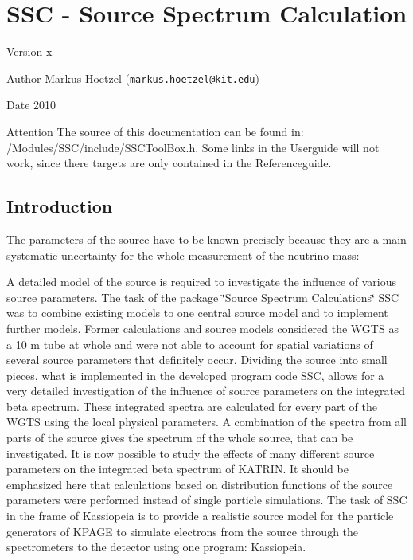 


\hypertarget{SSCmain}{}\section{SSC -\/ Source Spectrum Calculation}\label{SSCmain}
\begin{DoxyVersion}{Version}
x 
\end{DoxyVersion}
\begin{DoxyAuthor}{Author}
Markus Hoetzel (\href{mailto:markus.hoetzel@kit.edu}{\tt markus.hoetzel@kit.edu}) 
\end{DoxyAuthor}
\begin{DoxyDate}{Date}
2010
\end{DoxyDate}
\begin{DoxyAttention}{Attention}
The source of this documentation can be found in: /Modules/SSC/include/SSCToolBox.h. Some links in the Userguide will not work, since there targets are only contained in the Referenceguide.

\end{DoxyAttention}

\subsection{Introduction}\label{_s_s_cmain_Introduction}
The parameters of the source have to be known precisely because they are a main systematic uncertainty for the whole measurement of the neutrino mass:

A detailed model of the source is required to investigate the influence of various source parameters. The task of the package \char`\"{}Source Spectrum Calculations\char`\"{} SSC was to combine existing models to one central source model and to implement further models. Former calculations and source models considered the WGTS as a 10 m tube at whole and were not able to account for spatial variations of several source parameters that definitely occur. Dividing the source into small pieces, what is implemented in the developed program code SSC, allows for a very detailed investigation of the influence of source parameters on the integrated beta spectrum. These integrated spectra are calculated for every part of the WGTS using the local physical parameters. A combination of the spectra from all parts of the source gives the spectrum of the whole source, that can be investigated. It is now possible to study the effects of many different source parameters on the integrated beta spectrum of KATRIN. It should be emphasized here that calculations based on distribution functions of the source parameters were performed instead of single particle simulations. The task of SSC in the frame of Kassiopeia is to provide a realistic source model for the particle generators of KPAGE to simulate electrons from the source through the spectrometers to the detector using one program: Kassiopeia.
